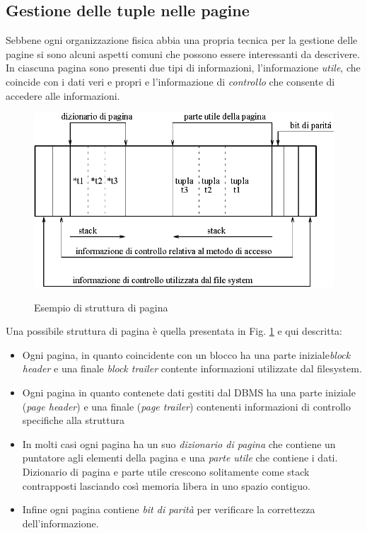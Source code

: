 \subsection{Gestione delle tuple nelle pagine}
Sebbene ogni organizzazione fisica abbia una propria tecnica per la gestione delle pagine si sono alcuni aspetti comuni che possono essere interessanti da descrivere. In ciascuna pagina sono presenti due tipi di informazioni, l'informazione \emph{utile}, che coincide con i dati veri e propri e l'informazione di \emph{controllo} che consente di accedere alle informazioni.
\begin{figure}
  \centering
  \includegraphics[width=15cm]{img/pagestr.png}\\
  \caption{Esempio di struttura di pagina}\label{fig:pagestr}
\end{figure}
Una possibile struttura di pagina è quella presentata in Fig. \ref{fig:pagestr} e qui descritta:
\begin{itemize}
  \item Ogni pagina, in quanto coincidente con un blocco ha una parte iniziale\emph{block header} e una finale \emph{block trailer} contente informazioni utilizzate dal filesystem.
  \item Ogni pagina in quanto contenete dati gestiti dal DBMS ha una parte iniziale (\emph{page header}) e una finale (\emph{page trailer}) contenenti informazioni di controllo specifiche alla struttura
  \item In molti casi ogni pagina ha un suo \emph{dizionario di pagina} che contiene un puntatore agli elementi della pagina e una \emph{parte utile} che contiene i dati. Dizionario di pagina e parte utile crescono solitamente come stack contrapposti lasciando così memoria libera in uno spazio contiguo.
  \item Infine ogni pagina contiene \emph{bit di parità} per verificare la correttezza dell'informazione.
\end{itemize}
